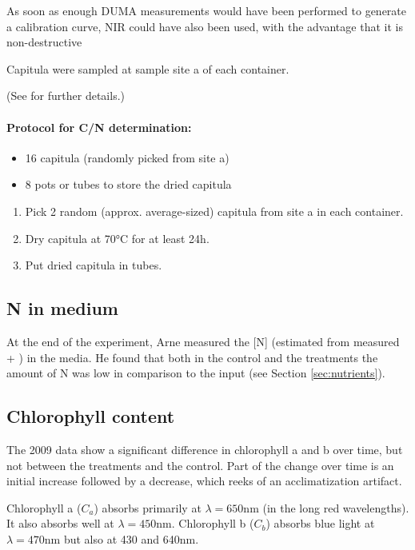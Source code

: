 \documentclass[12pt,a4paper,draft]{article}\usepackage[]{graphicx}\usepackage[]{color}
\begin{document}
As soon as enough DUMA measurements would have been performed to generate a calibration curve, NIR could have also been used, with the advantage that it is non-destructive

Capitula were sampled at sample site a of each container.

(See \citet[p.~15,16]{lanting2010} for further details.)

\paragraph{Protocol for C/N determination:}

\begin{itemize}
\item 16 capitula (randomly picked from site a)
\item 8 pots or tubes to store the dried capitula
\end{itemize}

\hline

\begin{enumerate}
\item Pick 2 random (approx. average-sized) capitula from site a in each container.
\item Dry capitula at 70°C for at least 24h.
\item Put dried capitula in tubes.
\end{enumerate}

\subsection{N in medium}

At the end of the experiment, Arne measured the [N] (estimated from measured  + ) in the media. He found that both in the control and the treatments the amount of N was low in comparison to the input (see Section \ref{sec:nutrients}).

\subsection{Chlorophyll content}
\label{sec:chlorophyll}

The 2009 data \citep[p.~17, fig.~16/17]{lanting2010} show a significant difference in chlorophyll a and b over time, but not between the treatments and the control. Part of the change over time is an initial increase followed by a decrease, which reeks of an acclimatization artifact.

Chlorophyll a ($C_a$) absorbs primarily at $\lambda=650$nm (in the long red wavelengths). It also absorbs well at $\lambda=450$nm. Chlorophyll b ($C_b$) absorbs blue light at $\lambda=470$nm but also at 430 and 640nm.
\end{document}
